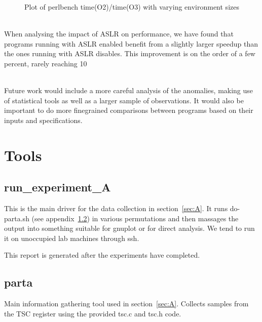 \documentclass{article}
\begin{document}
\begin{figure}[h]
    \caption{Plot of perlbench time(O2)/time(O3) with varying environment sizes}
    
\end{figure}


\\

When analysing the impact of ASLR on performance, we have found that programs running with ASLR enabled benefit from a slightly larger speedup than the ones running with ASLR disables. This improvement is on the order of a few percent, rarely reaching 10%
\\
\begin{framed}
    \label{lst:inactive}
    
\end{framed}

\\
Future work would include a more careful analysis of the anomalies, making use of statistical tools as well as a larger sample of observations. It would also be important to do more finegrained comparisons between programs based on their inputs and specifications.

\newpage
\appendix
\section{Tools}

\subsection{run\_experiment\_A} \label{tool:run}
This is the main driver for the data collection in section~\ref{sec:A}.
It runs do-parta.sh (see appendix~\ref{tool:parta}) in various permutations
and then massages the output into something suitable for gnuplot or for direct
analysis. We tend to run it on unoccupied lab machines through ssh.

This report is generated after the experiments have completed.


\subsection{parta} \label{tool:parta}
Main information gathering tool used in section~\ref{sec:A}. Collects samples
from the TSC register using the provided tsc.c and tsc.h code.
\end{document}
